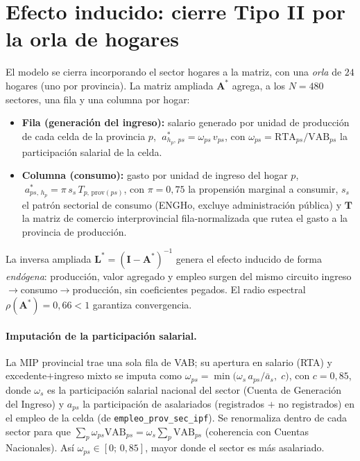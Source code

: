 \documentclass[11pt]{article}
\begin{document}
\section{Efecto inducido: cierre Tipo II por la orla de hogares}
El modelo se cierra incorporando el sector hogares a la matriz, con una \emph{orla} de $24$ hogares (uno por provincia). La matriz ampliada $\mathbf{A}^{\ast}$ agrega, a los $N=480$ sectores, una fila y una columna por hogar:
\begin{itemize}
\item \textbf{Fila (generación del ingreso):} salario generado por unidad de producción de cada celda de la provincia $p$, $\;a^{\ast}_{h_p,\,ps}=\omega_{ps}\,v_{ps}$, con $\omega_{ps}=\mathrm{RTA}_{ps}/\mathrm{VAB}_{ps}$ la participación salarial de la celda.
\item \textbf{Columna (consumo):} gasto por unidad de ingreso del hogar $p$, $\;a^{\ast}_{ps,\,h_p}=\pi\,s_s\,T_{p,\,\mathrm{prov}(ps)}$, con $\pi=0{,}75$ la propensión marginal a consumir, $s_s$ el patrón sectorial de consumo (ENGHo, excluye administración pública) y $\mathbf{T}$ la matriz de comercio interprovincial fila-normalizada que rutea el gasto a la provincia de producción.
\end{itemize}
La inversa ampliada $\mathbf{L}^{\ast}=(\mathbf{I}-\mathbf{A}^{\ast})^{-1}$ genera el efecto inducido de forma \emph{endógena}: producción, valor agregado y empleo surgen del mismo circuito ingreso$\to$consumo$\to$producción, sin coeficientes pegados. El radio espectral $\rho(\mathbf{A}^{\ast})=0{,}66<1$ garantiza convergencia.

\paragraph{Imputación de la participación salarial.} La MIP provincial trae una sola fila de VAB; su apertura en salario (RTA) y excedente$+$ingreso mixto se imputa como $\omega_{ps}=\min\!\big(\omega_s\,a_{ps}/\bar a_s,\;c\big)$, con $c=0{,}85$, donde $\omega_s$ es la participación salarial nacional del sector (Cuenta de Generación del Ingreso) y $a_{ps}$ la participación de asalariados (registrados $+$ no registrados) en el empleo de la celda (de \texttt{empleo\_prov\_sec\_ipf}). Se renormaliza dentro de cada sector para que $\sum_p \omega_{ps}\mathrm{VAB}_{ps}=\omega_s\sum_p\mathrm{VAB}_{ps}$ (coherencia con Cuentas Nacionales). Así $\omega_{ps}\in[0;\,0{,}85]$, mayor donde el sector es más asalariado.
\end{document}
